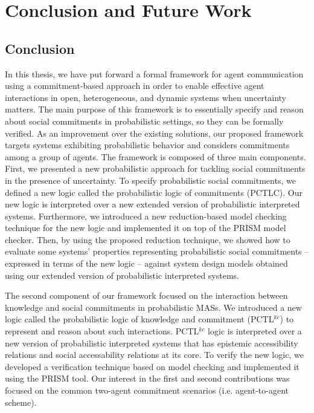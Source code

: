 \chapter{Conclusion and Future Work}\label{Chap5:Conclusion}

\section{Conclusion}

In this thesis, we have put forward a formal framework for agent communication using a commitment-based approach in order to enable effective agent interactions in open, heterogeneous, and dynamic systems when
uncertainty matters. The main purpose of this framework is to essentially specify and reason about social commitments in probabilistic settings, so they can be formally verified. As an improvement over the existing solutions, our proposed framework targets systems exhibiting probabilistic behavior and considers commitments among a group of agents. The framework is composed of three main components. First, we presented a new probabilistic approach for tackling social commitments in the presence of uncertainty. To specify probabilistic social commitments, we defined a new logic called the probabilistic logic of commitments (PCTLC). Our new logic is interpreted over a new extended version of probabilistic interpreted systems. Furthermore, we introduced a new reduction-based model checking technique for the new logic and implemented it on top of the PRISM model checker. Then, by using the proposed reduction technique, we showed how to evaluate some systems' properties representing probabilistic social commitments -- expressed in terms of the new logic -- against system design models obtained using our extended version of probabilistic interpreted systems.

The second component of our framework focused on the interaction between knowledge and social commitments in probabilistic MASs. We introduced a new logic called the probabilistic logic of knowledge and commitment (PCTL$^{kc}$) to represent and reason about such interactions. PCTL$^{kc}$ logic is interpreted over a new version of probabilistic interpreted systems that has epistemic accessibility relations and social accessability relations at its core. To verify the new logic, we developed a verification technique based on model checking and implemented it using the PRISM tool. Our interest in the first and second contributions was focused on the common two-agent commitment scenarios (i.e. agent-to-agent scheme).

